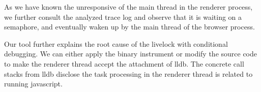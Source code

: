 As we have known the unresponsive of the main thread in the renderer process,                                            
we further consult the analyzed trace log and observe that it is waiting on a semaphore,                                 
and eventually waken up by the main thread of the browser process.                                                       
                                                                                                                         
Our tool further explains the root cause of the livelock with conditional debugging.                                     
We can either apply the binary instrument or modify the source code to make the renderer thread accept the attachment of lldb.
The concrete call stacks from lldb disclose the task processing in the renderer thread is related to running javascript.   

